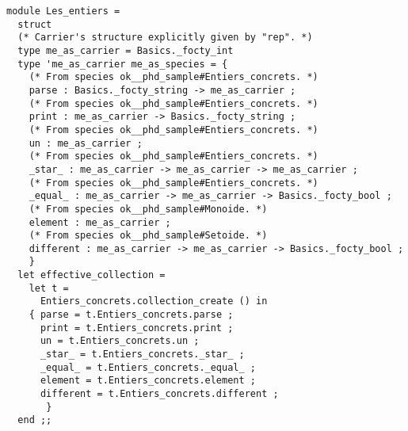 {\footnotesize
\begin{lstlisting}[language=MyOCaml, title=\ocaml\ code for collections]
module Les_entiers =
  struct
  (* Carrier's structure explicitly given by "rep". *)
  type me_as_carrier = Basics._focty_int
  type 'me_as_carrier me_as_species = {
    (* From species ok__phd_sample#Entiers_concrets. *)
    parse : Basics._focty_string -> me_as_carrier ;
    (* From species ok__phd_sample#Entiers_concrets. *)
    print : me_as_carrier -> Basics._focty_string ;
    (* From species ok__phd_sample#Entiers_concrets. *)
    un : me_as_carrier ;
    (* From species ok__phd_sample#Entiers_concrets. *)
    _star_ : me_as_carrier -> me_as_carrier -> me_as_carrier ;
    (* From species ok__phd_sample#Entiers_concrets. *)
    _equal_ : me_as_carrier -> me_as_carrier -> Basics._focty_bool ;
    (* From species ok__phd_sample#Monoide. *)
    element : me_as_carrier ;
    (* From species ok__phd_sample#Setoide. *)
    different : me_as_carrier -> me_as_carrier -> Basics._focty_bool ;
    }
  let effective_collection =
    let t =
      Entiers_concrets.collection_create () in
    { parse = t.Entiers_concrets.parse ;
      print = t.Entiers_concrets.print ;
      un = t.Entiers_concrets.un ;
      _star_ = t.Entiers_concrets._star_ ;
      _equal_ = t.Entiers_concrets._equal_ ;
      element = t.Entiers_concrets.element ;
      different = t.Entiers_concrets.different ;
       }
  end ;;


\end{lstlisting}}
